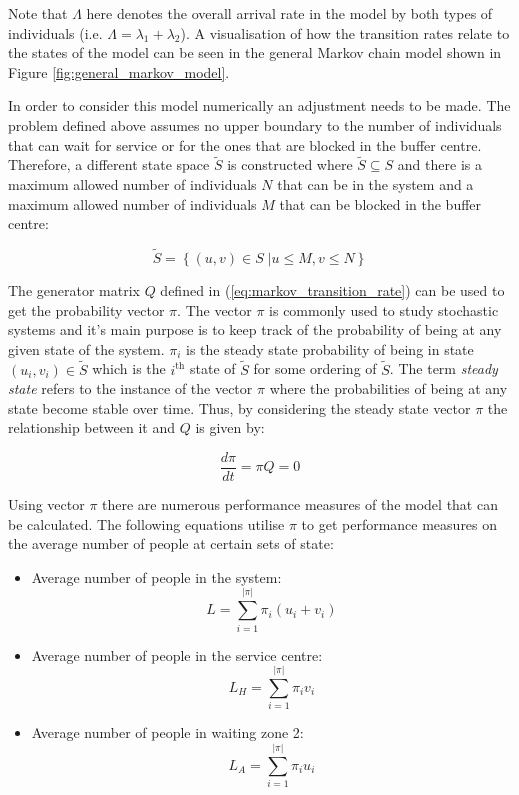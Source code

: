Note that \(\Lambda\) here denotes the overall arrival rate in the model by both 
types of individuals (i.e. \(\Lambda = \lambda_1 + \lambda_2\)). 
A visualisation of how the transition rates relate to the states of the model 
can be seen in the general Markov chain model shown in Figure 
\ref{fig:general_markov_model}.




In order to consider this model numerically an adjustment needs to be made. 
The problem defined above assumes no upper boundary to the number of individuals 
that can wait for service or for the ones that are blocked in the buffer centre. 
Therefore, a different state space \( \tilde S \) is constructed where 
\( \tilde S \subseteq S \) and there is a maximum allowed number of individuals 
\(N\) that can be in the system and a maximum allowed number of individuals 
\(M\) that can be blocked in the buffer centre:

\begin{equation}
    \tilde S = \left\{ (u, v) \in S\;| u \leq M, v\leq N \right\}
\end{equation}


The generator matrix \( Q \) defined in (\ref{eq:markov_transition_rate}) can 
be used to get the probability vector \( \pi \).
The vector \( \pi \) is commonly used to study stochastic systems and it's main
purpose is to keep track of the probability of being at any given state of 
the system. 
\(\pi_i\) is the steady state probability of being in state \((u_i, v_i) \in 
\tilde S\) which is the \(i^{\text{th}}\) state of \(\tilde S\) for some ordering of 
\(\tilde S\).
The term \textit{steady state} refers to the instance of the vector \( \pi \) 
where the probabilities of being at any state become stable over time. 
Thus, by considering the steady state vector \( \pi \) the relationship between 
it and \( Q \) is given by:

\[
    \frac{d\pi}{dt} = \pi Q = 0
\]

Using vector \(\pi\) there are numerous performance measures of the model that 
can be calculated. 
The following equations utilise \(\pi\) to get performance measures on the 
average number of people at certain sets of state:

\begin{itemize}
    \item Average number of people in the system: 
        \[L = \sum_{i=1}^{|\pi|} \pi_i (u_i + v_i)\]
    \item Average number of people in the service centre: 
        \[L_H = \sum_{i=1}^{|\pi|} \pi_i v_i\]
    \item Average number of people in waiting zone 2:
        \[L_A = \sum_{i=1}^{|\pi|} \pi_i u_i\] 
\end{itemize}

